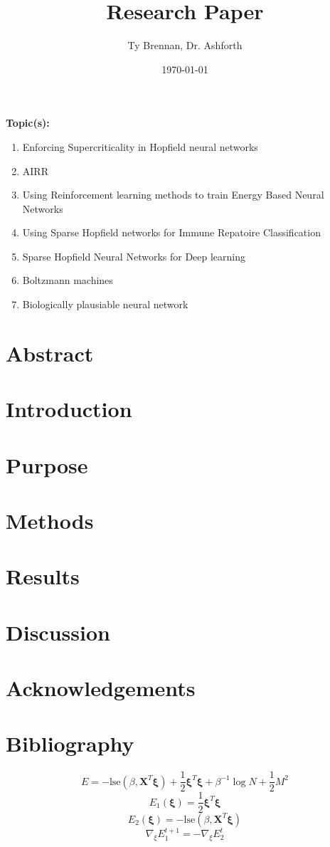 \documentclass[letterpaper, 12pt]{article}
\title{Research Paper}
\author{Ty Brennan, Dr. Ashforth}
\date{\today}
\begin{document}
\maketitle
\textbf{Topic(s):}
\begin{enumerate}
    \item Enforcing Supercriticality in Hopfield neural networks
    \item AIRR 
    \item Using Reinforcement learning methods to train Energy Based Neural Networks
    \item Using Sparse Hopfield networks for Immune Repatoire Classification
    \item Sparse Hopfield Neural Networks for Deep learning
    \item Boltzmann machines
    \item Biologically plausiable neural network
\end{enumerate}
\section*{Abstract}
\section*{Introduction}
\section*{Purpose}
\section*{Methods}
\section*{Results}
\section*{Discussion}
\section*{Acknowledgements}
\section*{Bibliography}
\[E = -\text{lse}(\beta,\bm{X}^T\bm{\xi})+\frac 1 2 \bm{\xi}^T\bm{\xi} + \beta^{-1}\log{N} + \frac 1 2 M^2\]
\[E_1(\bm{\xi}) = \frac 1 2 \bm{\xi}^T\bm{\xi}\]
\[E_2(\bm{\xi}) = -\text{lse}(\beta, \bm{X}^T\bm{\xi})\]
\[\nabla_\xi E_1^{t+1} = -\nabla_\xi E_2^{t}\]
\end{document}
